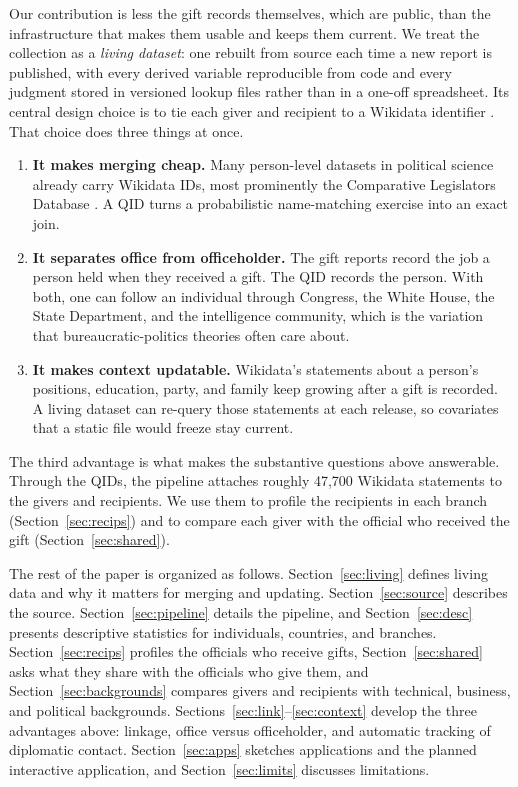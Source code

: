 \documentclass[11pt]{article}
\begin{document}
Our contribution is less the gift records themselves, which are public, than the infrastructure that makes them usable and keeps them current. We treat the collection as a \emph{living dataset}: one rebuilt from source each time a new report is published, with every derived variable reproducible from code and every judgment stored in versioned lookup files rather than in a one-off spreadsheet. Its central design choice is to tie each giver and recipient to a Wikidata identifier \citep[QID;][]{vrandecic2014wikidata}. That choice does three things at once.
\begin{enumerate}
\item \textbf{It makes merging cheap.} Many person-level datasets in political science already carry Wikidata IDs, most prominently the Comparative Legislators Database \citep[CLD;][]{gobel2022cld}. A QID turns a probabilistic name-matching exercise \citep{enamorado2019using} into an exact join.
\item \textbf{It separates office from officeholder.} The gift reports record the job a person held when they received a gift. The QID records the person. With both, one can follow an individual through Congress, the White House, the State Department, and the intelligence community, which is the variation that bureaucratic-politics theories often care about.
\item \textbf{It makes context updatable.} Wikidata's statements about a person's positions, education, party, and family keep growing after a gift is recorded. A living dataset can re-query those statements at each release, so covariates that a static file would freeze stay current.
\end{enumerate}
The third advantage is what makes the substantive questions above answerable. Through the QIDs, the pipeline attaches roughly 47,700 Wikidata statements to the givers and recipients. We use them to profile the recipients in each branch (Section~\ref{sec:recips}) and to compare each giver with the official who received the gift (Section~\ref{sec:shared}).

The rest of the paper is organized as follows. Section~\ref{sec:living} defines living data and why it matters for merging and updating. Section~\ref{sec:source} describes the source. Section~\ref{sec:pipeline} details the pipeline, and Section~\ref{sec:desc} presents descriptive statistics for individuals, countries, and branches. Section~\ref{sec:recips} profiles the officials who receive gifts, Section~\ref{sec:shared} asks what they share with the officials who give them, and Section~\ref{sec:backgrounds} compares givers and recipients with technical, business, and political backgrounds. Sections~\ref{sec:link}--\ref{sec:context} develop the three advantages above: linkage, office versus officeholder, and automatic tracking of diplomatic contact. Section~\ref{sec:apps} sketches applications and the planned interactive application, and Section~\ref{sec:limits} discusses limitations.
\end{document}
